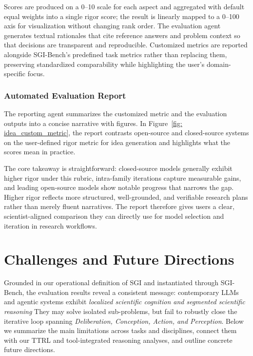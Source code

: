 Scores are produced on a 0–10 scale for each aspect and aggregated with default equal weights into a single rigor score; the result is linearly mapped to a 0–100 axis for visualization without changing rank order. The evaluation agent generates textual rationales that cite reference answers and problem context so that decisions are transparent and reproducible. Customized metrics are reported alongside SGI-Bench's predefined task metrics rather than replacing them, preserving standardized comparability while highlighting the user's domain-specific focus.



\subsubsection{Automated Evaluation Report}
The reporting agent summarizes the customized metric and the evaluation outputs into a concise narrative with figures. In Figure~\ref{fig: idea_custom_metric}, the report contrasts open-source and closed-source systems on the user-defined rigor metric for idea generation and highlights what the scores mean in practice.

The core takeaway is straightforward: closed-source models generally exhibit higher rigor under this rubric, intra-family iterations capture measurable gains, and leading open-source models show notable progress that narrows the gap. Higher rigor reflects more structured, well-grounded, and verifiable research plans rather than merely fluent narratives. The report therefore gives users a clear, scientist-aligned comparison they can directly use for model selection and iteration in research workflows.





\section{Challenges and Future Directions}
Grounded in our operational definition of SGI and instantiated through SGI-Bench, the evaluation results reveal a consistent message: contemporary LLMs and agentic systems exhibit \emph{localized scientific cognition and segmented scientific reasoning}
They may solve isolated sub-problems, but fail to robustly close the iterative loop spanning \textit{Deliberation, Conception, Action, and Perception}. Below we summarize the main limitations across tasks and disciplines, connect them with our TTRL and tool-integrated reasoning analyses, and outline concrete future directions.


